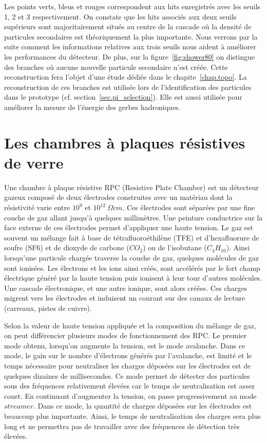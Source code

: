 Les points verts, bleus et rouges correspondent aux hits enregistrés avec les seuils 1, 2 et 3 respectivement. On constate que les hits associés aux deux seuils supérieurs sont majoritairement situés au centre de la cascade où la densité de particules secondaires est théoriquement la plus importante. Nous verrons par la suite comment les informations relatives aux trois seuils nous aident à améliorer les performances du détecteur. De plus, sur la figure~\ref{fig:shower80} on distingue des branches où aucune nouvelle particule secondaire n'est créée. Cette reconstruction fera l'objet d'une étude dédiée dans le chapite~\ref{chap.topo}. La reconstruction de ces branches est utilisée lors de l'identification des particules dans le prototype (cf. section~\ref{sec.pi_selection}). Elle est aussi utilisée pour améliorer la mesure de l'énergie des gerbes hadroniques.

\section{Les chambres à plaques résistives de verre}
\label{sec.grpc}
Une chambre à plaque résistive RPC (Resistive Plate Chamber) est un détecteur gazeux composé de deux électrodes construites avec un matériau dont la résistivité varie entre $10^9$ et $10^{12}~\Omega cm$. Ces électrodes sont séparées par une fine couche de gaz allant jusqu'à quelques millimètres. Une peinture conductrice sur la face externe de ces électrodes permet d'appliquer une haute tension. Le gaz est souvent un mélange fait à base de tétrafluoroéthilène (TFE) et d'hexafluorure de soufre (SF6) et de dioxyde de carbone ($CO_2$) ou de l'isobutane ($C_4H_{10}$). Ainsi lorsqu'une particule chargée traverse la couche de gaz, quelques molécules de gaz sont ionisées. Les électrons et les ions ainsi créés, sont accélérés par le fort champ électrique généré par la haute tension puis ionisent à leur tour d'autres molécules. Une cascade électronique, et une autre ionique, sont alors créées. Ces charges migrent vers les électrodes et induisent un courant sur des canaux de lecture (carreaux, pistes de cuivre).

Selon la valeur de haute tension appliquée et la composition du mélange de gaz, on peut différencier plusieurs modes de fonctionnement des RPC. Le premier mode obtenu, lorsqu'on augmente la tension, est le mode avalanche. Dans ce mode, le gain sur le nombre d'électrons générés par l'avalanche, est limité et le temps nécessaire pour neutraliser les charges déposées sur les électrodes est de quelques dizaines de millisecondes. Ce mode permet de détecter des particules sous des fréquences relativement élevées car le temps de neutralisation est assez court. En continuant d'augmenter la tension, on passe progressivement au mode $streamer$. Dans ce mode, la quantité de charges déposées sur les électrodes est beaucoup plus importante. Ainsi, le temps de neutralisation des charges sera plus long et ne permettra pas de travailler avec des fréquences de détection très élevées.

